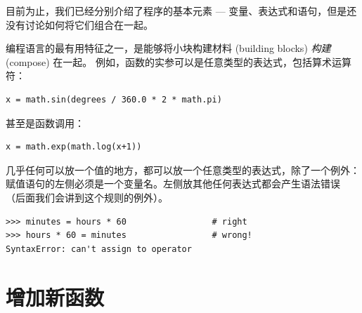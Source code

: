 目前为止，我们已经分别介绍了程序的基本元素 --- 变量、表达式和语句，但是还没有讨论如何将它们组合在一起。


编程语言的最有用特征之一，是能够将小块构建材料 (building blocks) {\em 构建} (compose) 在一起。
例如，函数的实参可以是任意类型的表达式，包括算术运算符：

\begin{lstlisting}
x = math.sin(degrees / 360.0 * 2 * math.pi)
\end{lstlisting}

%

甚至是函数调用：

\begin{lstlisting}
x = math.exp(math.log(x+1))
\end{lstlisting}

%

几乎任何可以放一个值的地方，都可以放一个任意类型的表达式，除了一个例外：
赋值语句的左侧必须是一个变量名。左侧放其他任何表达式都会产生语法错误
（后面我们会讲到这个规则的例外）。

\begin{lstlisting}
>>> minutes = hours * 60                 # right
>>> hours * 60 = minutes                 # wrong!
SyntaxError: can't assign to operator
\end{lstlisting}
%
  
  

%
\section{增加新函数}


